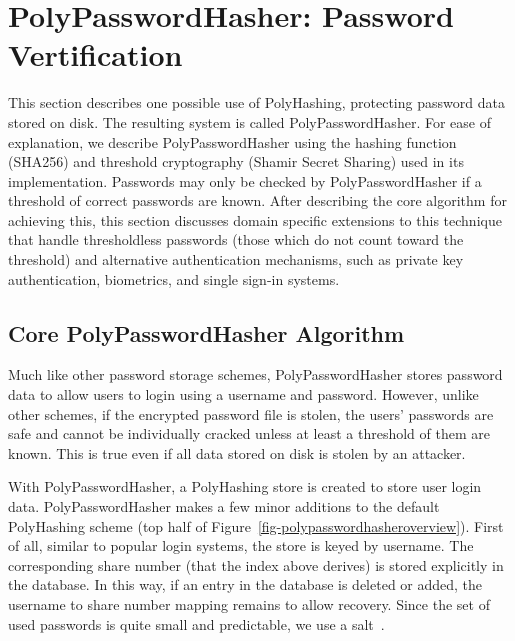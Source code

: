 

\section{PolyPasswordHasher: Password Vertification}

This section describes one possible use of PolyHashing,
protecting password data stored on disk.   The resulting system is called
PolyPasswordHasher.
For ease of explanation, we describe PolyPasswordHasher using the hashing function
(SHA256) and threshold cryptography (Shamir Secret Sharing) used in its
implementation.
Passwords may only be checked by PolyPasswordHasher if a threshold of correct
passwords are known.   After describing the core algorithm for achieving
this, this section discusses domain specific extensions to this technique
that handle thresholdless passwords (those which do not count toward
the threshold) and alternative authentication mechanisms, such
as private key authentication, biometrics, and single sign-in systems.



\subsection{Core PolyPasswordHasher Algorithm}

Much like other password storage schemes, PolyPasswordHasher stores password data 
to allow users to login using a username and password.   However, unlike 
other schemes, if the encrypted password file is stolen, the users' passwords
are safe and cannot be individually cracked unless at least a threshold
of them are known.   This is true even if all data stored on disk is stolen
by an attacker.

With PolyPasswordHasher, a PolyHashing store is created to store user login data.
PolyPasswordHasher makes a few minor additions to the default PolyHashing scheme
(top half of Figure~\ref{fig-polypasswordhasheroverview}).   First of all, similar
to popular login systems, the store is keyed by username.   The corresponding
share number (that the index above derives) is stored explicitly in the 
database.   In this way, if an entry in the database is deleted or added, the
username to share number mapping remains to allow recovery.   Since
the set of used passwords is quite small and predictable, we use a 
salt~\cite{klein1990foiling}.


